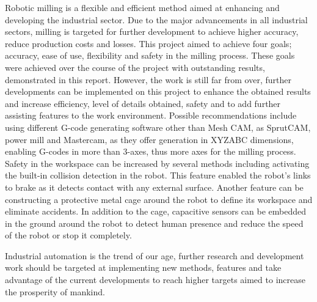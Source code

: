 
Robotic milling is a flexible and efficient method aimed at enhancing and developing the industrial sector. Due to the major advancements in all industrial sectors, milling is targeted for further development to achieve higher accuracy, reduce production costs and losses. This project aimed to achieve four goals; accuracy, ease of use, flexibility and safety in the milling process. These goals were achieved over the course of the project with outstanding results, demonstrated in this report. 
\medskip			
However, the work is still far from over, further developments can be implemented on this project to enhance the obtained results and increase efficiency, level of details obtained, safety and to add further assisting features to the work environment. 
Possible recommendations include using different G-code generating software other than Mesh CAM, as SprutCAM, power mill and Mastercam, as they offer generation in XYZABC dimensions, enabling G-codes in more than 3-axes, thus more axes for the milling process. Safety in the workspace can be increased by several methods including activating the built-in collision detection in the robot. This feature enabled the robot’s links to brake as it detects contact with any external surface. Another feature can be constructing a protective metal cage around the robot to define its workspace and eliminate accidents. In addition to the cage, capacitive sensors can be embedded in the ground around the robot to detect human presence and reduce the speed of the robot or stop it completely.


\medskip Industrial automation is the trend of our age, further research and development work should be targeted at implementing new methods, features and take advantage of the current developments to reach higher targets aimed to increase the prosperity of mankind.